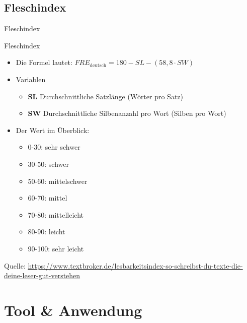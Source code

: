 \documentclass[
	aspectratio=169, %
	8pt, %
]{beamer}
\begin{document}
\subsection{Fleschindex}
\begin{frame}[fragile]{Fleschindex}

	\begin{definition}{Fleschindex}

	\begin{itemize}
		
		\item Die Formel lautet:
			$FRE_{\text{deutsch}} = 180 - SL - (58{,}8 \cdot SW)$
		\item Variablen
		\begin{itemize}
			\item \textbf{SL} Durchschnittliche Satzlänge (Wörter pro Satz) 
			\item \textbf{SW} Durchschnittliche Silbenanzahl pro Wort (Silben pro Wort)
		\end{itemize}
		\item Der Wert im Überblick:
		\begin{itemize}
			\item 0-30: sehr schwer 
			\item 30-50: schwer
			\item 50-60: mittelschwer
			\item 60-70: mittel 
			\item 70-80: mittelleicht
			\item 80-90: leicht
			\item 90-100: sehr leicht 
		\end{itemize}
	\end{itemize}
	\end{definition}

	{\tiny Quelle: \url{https://www.textbroker.de/lesbarkeitsindex-so-schreibst-du-texte-die-deine-leser-gut-verstehen}}

\end{frame}

\section{Tool \& Anwendung}
\end{document}
